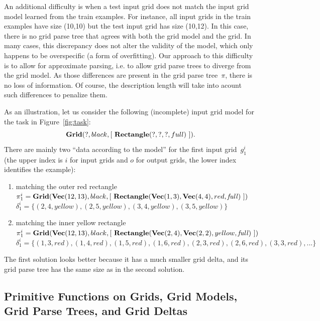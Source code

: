 \documentclass[a4paper]{llncs}
\begin{document}
An additional difficulty is when a test input grid does not match the
input grid model learned from the train examples. For instance, all
input grids in the train examples have size (10,10) but the test
input grid has size (10,12). In this case, there is no grid parse tree
that agrees with both the grid model and the grid. In many cases, this
discrepancy does not alter the validity of the model, which only
happens to be overspecific (a form of overfitting).
%
Our approach to this difficulty is to allow for approximate parsing,
i.e. to allow grid parse trees to diverge from the grid model. As
those differences are present in the grid parse tree~$\pi$, there is
no loss of information. Of course, the description length will take
into acount such differences to penalize them.

As an illustration, let us consider the following (incomplete) input
grid model for the task in Figure~\ref{fig:task}:
\[ {\bf Grid}(?, black, [\ {\bf Rectangle}(?,?,?,full)\ ]). \] There
are mainly two ``data according to the model'' for the first input
grid~$g^i_1$ (the upper index is $i$ for input grids and $o$ for
output grids, the lower index identifies the example):
\begin{enumerate}
\item matching the outer red rectangle\\
  $\pi^i_1 = {\bf Grid}({\bf Vec}(12,13), black, [\ {\bf Rectangle}({\bf Vec}(1,3), {\bf Vec}(4,4), red, {\it full})\ ])$\\
  $\delta^i_1 = \{ (2,4,yellow), (2,5,yellow), (3,4,yellow), (3,5,yellow) \}$

\item matching the inner yellow rectangle\\
  $\pi^i_1 = {\bf Grid}({\bf Vec}(12,13), black, [\ {\bf Rectangle}({\bf Vec}(2,4), {\bf Vec}(2,2), yellow, {\it full})\ ])$\\
  $\delta^i_1 = \{ (1,3,red), (1,4,red), (1,5,red), (1,6,red), (2,3,red), (2,6,red), (3,3,red), ...\}$
\end{enumerate}
The first solution looks better because it has a much smaller grid
delta, and its grid parse tree has the same size as in the second
solution.


\subsection{Primitive Functions on Grids, Grid Models, Grid Parse Trees, and Grid Deltas}
\label{primitive:functions}
\end{document}
